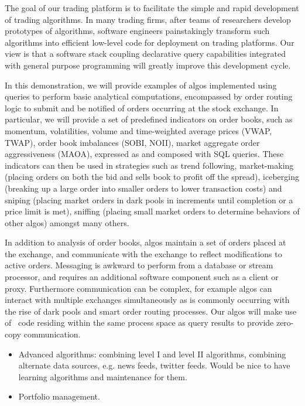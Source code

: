 The goal of our trading platform is to facilitate the simple and rapid
development of trading algorithms. In many trading firms, after teams of
researchers develop prototypes of algorithms, software engineers painstakingly
transform such algorithms into efficient low-level code for deployment on
trading platforms. Our view is that a software stack coupling declarative query
capabilities integrated with general purpose programming will greatly improve
this development cycle.

In this demonstration, we will provide examples of algos implemented using
queries to perform basic analytical computations, encompassed by order routing
logic to submit and be notified of orders occurring at the stock exchange.  In
particular, we will provide a set of predefined indicators on order books, such
as momentum, volatilities, volume and time-weighted average prices (VWAP, TWAP),
order book imbalances (SOBI, NOII), market aggregate order aggressiveness
(MAOA), expressed as and composed with SQL queries. These indicators can then be
used in strategies such as trend following, market-making (placing orders on
both the bid and sells book to profit off the spread), iceberging (breaking up a
large order into smaller orders to lower transaction costs) and sniping (placing
market orders in dark pools in increments until completion or a price limit is
met), sniffing (placing small market orders to determine behaviors of other
algos) amongst many others. 

In addition to analysis of order books, algos maintain a set of orders placed at
the exchange, and communicate with the exchange to reflect modifications to
active orders. Messaging is awkward to perform from a database or stream
processor, and requires an additional software component such as a client or
proxy. Furthermore communication can be complex, for example algos can interact
with multiple exchanges simultaneously as is commonly occurring with the rise of
dark pools and smart order routing processes. Our algos will make use of
\targetlang\ code residing within the same process space as query results to
provide zero-copy communication.


\begin{itemize}
  \item Advanced algorithms: combining level I and level II algorithms,
  combining alternate data sources, e.g. news feeds, twitter feeds. Would be
  nice to have learning algorithms and maintenance for them.
  \item Portfolio management.
\end{itemize}

